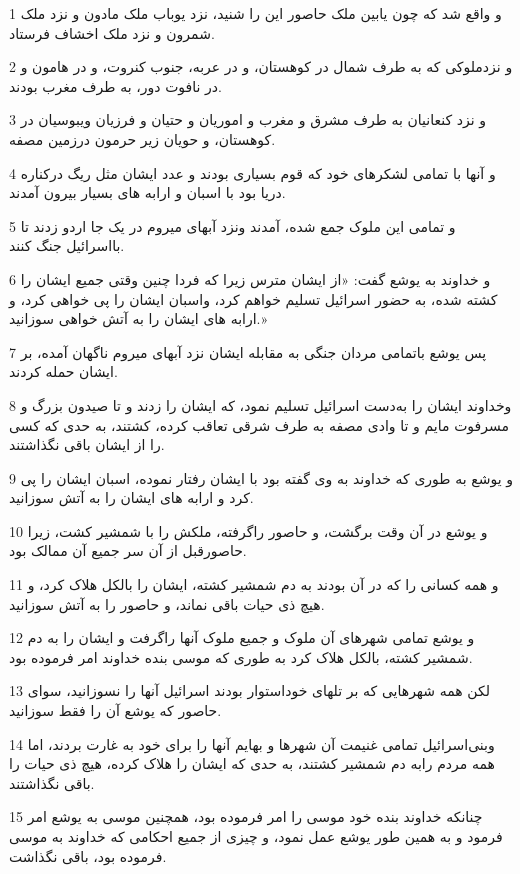 \par 1 و واقع شد که چون یابین ملک حاصور این را شنید، نزد یوباب ملک مادون و نزد ملک شمرون و نزد ملک اخشاف فرستاد.
\par 2 و نزدملوکی که به طرف شمال در کوهستان، و در عربه، جنوب کنروت، و در هامون و در نافوت دور، به طرف مغرب بودند.
\par 3 و نزد کنعانیان به طرف مشرق و مغرب و اموریان و حتیان و فرزیان ویبوسیان در کوهستان، و حویان زیر حرمون درزمین مصفه.
\par 4 و آنها با تمامی لشکرهای خود که قوم بسیاری بودند و عدد ایشان مثل ریگ درکناره دریا بود با اسبان و ارابه های بسیار بیرون آمدند.
\par 5 و تمامی این ملوک جمع شده، آمدند ونزد آبهای میروم در یک جا اردو زدند تا بااسرائیل جنگ کنند.
\par 6 و خداوند به یوشع گفت: «از ایشان مترس زیرا که فردا چنین وقتی جمیع ایشان را کشته شده، به حضور اسرائیل تسلیم خواهم کرد، واسبان ایشان را پی خواهی کرد، و ارابه های ایشان را به آتش خواهی سوزانید.»
\par 7 پس یوشع باتمامی مردان جنگی به مقابله ایشان نزد آبهای میروم ناگهان آمده، بر ایشان حمله کردند.
\par 8 وخداوند ایشان را به‌دست اسرائیل تسلیم نمود، که ایشان را زدند و تا صیدون بزرگ و مسرفوت مایم و تا وادی مصفه به طرف شرقی تعاقب کرده، کشتند، به حدی که کسی را از ایشان باقی نگذاشتند.
\par 9 و یوشع به طوری که خداوند به وی گفته بود با ایشان رفتار نموده، اسبان ایشان را پی کرد و ارابه های ایشان را به آتش سوزانید.
\par 10 و یوشع در آن وقت برگشت، و حاصور راگرفته، ملکش را با شمشیر کشت، زیرا حاصورقبل از آن سر جمیع آن ممالک بود.
\par 11 و همه کسانی را که در آن بودند به دم شمشیر کشته، ایشان را بالکل هلاک کرد، و هیچ ذی حیات باقی نماند، و حاصور را به آتش سوزانید.
\par 12 و یوشع تمامی شهرهای آن ملوک و جمیع ملوک آنها راگرفت و ایشان را به دم شمشیر کشته، بالکل هلاک کرد به طوری که موسی بنده خداوند امر فرموده بود.
\par 13 لکن همه شهرهایی که بر تلهای خوداستوار بودند اسرائیل آنها را نسوزانید، سوای حاصور که یوشع آن را فقط سوزانید.
\par 14 وبنی‌اسرائیل تمامی غنیمت آن شهرها و بهایم آنها را برای خود به غارت بردند، اما همه مردم رابه دم شمشیر کشتند، به حدی که ایشان را هلاک کرده، هیچ ذی حیات را باقی نگذاشتند.
\par 15 چنانکه خداوند بنده خود موسی را امر فرموده بود، همچنین موسی به یوشع امر فرمود و به همین طور یوشع عمل نمود، و چیزی از جمیع احکامی که خداوند به موسی فرموده بود، باقی نگذاشت.
